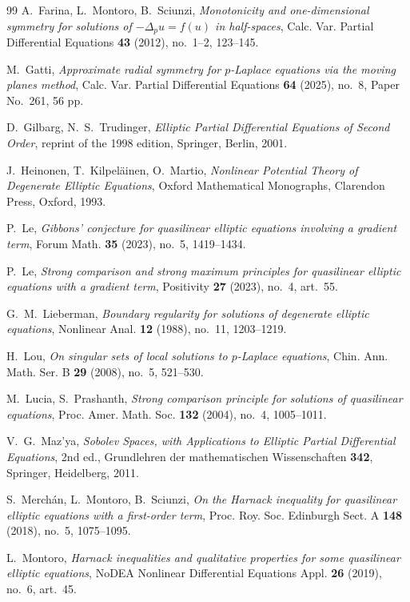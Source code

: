 \documentclass[reqno]{amsart}
\theoremstyle{plain}
\theoremstyle{definition}
\theoremstyle{remark}
\begin{document}
\begin{thebibliography}{99}
 A.~Farina, L.~Montoro, B.~Sciunzi, \emph{Monotonicity and one-dimensional symmetry for
solutions of $-\Delta_pu=f(u)$ in half-spaces}, Calc. Var. Partial Differential Equations
\textbf{43} (2012), no.~1--2, 123--145.

 M.~Gatti, \emph{Approximate radial symmetry for $p$-Laplace equations via the moving
planes method}, Calc. Var. Partial Differential Equations \textbf{64} (2025), no.~8, Paper No.~261,
56 pp.

 D.~Gilbarg, N.~S.~Trudinger, \emph{Elliptic Partial Differential Equations of Second
Order}, reprint of the 1998 edition, Springer, Berlin, 2001.

 J.~Heinonen, T.~Kilpel\"ainen, O.~Martio, \emph{Nonlinear Potential Theory of
Degenerate Elliptic Equations}, Oxford Mathematical Monographs, Clarendon Press, Oxford, 1993.

 P.~Le, \emph{Gibbons' conjecture for quasilinear elliptic equations involving a
gradient term}, Forum Math. \textbf{35} (2023), no.~5, 1419--1434.

 P.~Le, \emph{Strong comparison and strong maximum principles for quasilinear elliptic
equations with a gradient term}, Positivity \textbf{27} (2023), no.~4, art.~55.

 G.~M.~Lieberman, \emph{Boundary regularity for solutions of degenerate elliptic
equations}, Nonlinear Anal. \textbf{12} (1988), no.~11, 1203--1219.

 H.~Lou, \emph{On singular sets of local solutions to $p$-Laplace equations}, Chin.
Ann. Math. Ser. B \textbf{29} (2008), no.~5, 521--530.

 M.~Lucia, S.~Prashanth, \emph{Strong comparison principle for solutions of quasilinear
equations}, Proc. Amer. Math. Soc. \textbf{132} (2004), no.~4, 1005--1011.

 V.~G.~Maz'ya, \emph{Sobolev Spaces, with Applications to Elliptic Partial
Differential Equations}, 2nd ed., Grundlehren der mathematischen Wissenschaften \textbf{342},
Springer, Heidelberg, 2011.

 S.~Merch\'an, L.~Montoro, B.~Sciunzi, \emph{On the Harnack inequality for quasilinear
elliptic equations with a first-order term}, Proc. Roy. Soc. Edinburgh Sect. A \textbf{148} (2018),
no.~5, 1075--1095.

 L.~Montoro, \emph{Harnack inequalities and qualitative properties for some quasilinear
elliptic equations}, NoDEA Nonlinear Differential Equations Appl. \textbf{26} (2019), no.~6,
art.~45.


\end{thebibliography}
\end{document}
